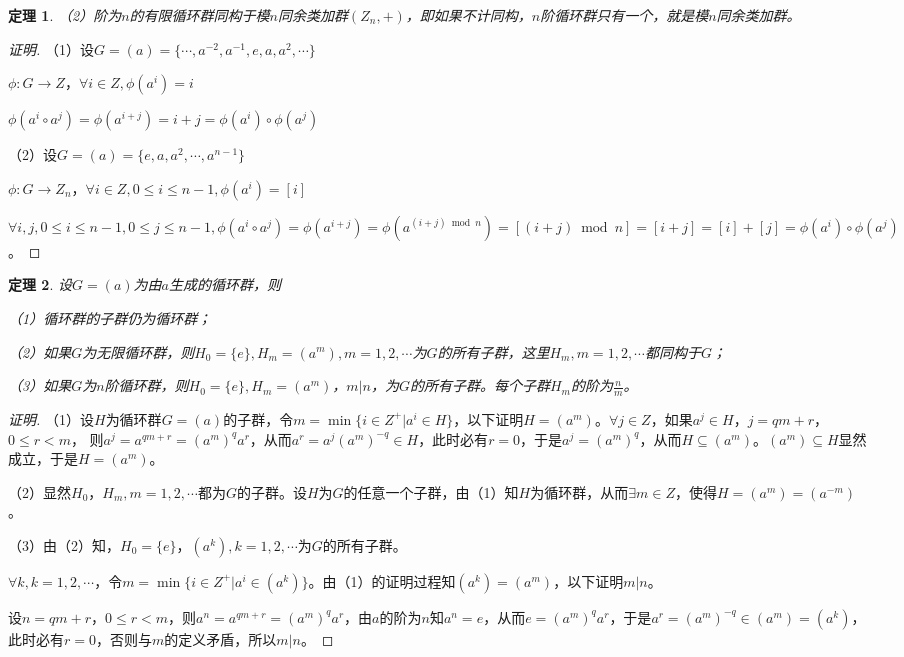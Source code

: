 \documentclass{article}
\newtheorem{Thm}{定理}
\begin{document}
\begin{CJK*}{UTF8}{gbsn}
\begin{Thm}
  （2）阶为$n$的有限循环群同构于模$n$同余类加群$(Z_n,+)$，即如果不计同构，$n$阶循环群只有一个，就是模$n$同余类加群。
\end{Thm}
\begin{proof}[证明]
  （1）设$G=(a)=\{\cdots,a^{-2},a^{-1},e,a,a^2,\cdots\}$

  $\phi:G\to Z$，$\forall i\in Z, \phi(a^i)=i$

  $\phi(a^i\circ a^j)=\phi(a^{i+j})=i+j=\phi(a^i)\circ\phi(a^j)$

  （2）设$G=(a)=\{e,a,a^2,\cdots,a^{n-1}\}$

  $\phi:G\to Z_n$，$\forall i\in Z, 0\leq i\leq n-1,\phi(a^i)=[i]$

  $\forall i,j, 0\leq i\leq n-1,0\leq j\leq n-1,\phi(a^i\circ a^j)=\phi(a^{i+j})=\phi(a^{(i+j)\bmod n})=[(i+j)\bmod n]=[i+j]=[i]+[j]=\phi(a^i)\circ \phi(a^j)$。

\end{proof}
\begin{Thm}
  设$G=(a)$为由$a$生成的循环群，则

  （1）循环群的子群仍为循环群；

  （2）如果$G$为无限循环群，则$H_0=\{e\},H_m=(a^m),m=1,2,\cdots$为$G$的所有子群，这里$H_m,m=1,2,\cdots$都同构于$G$；

  （3）如果$G$为$n$阶循环群，则$H_0=\{e\},H_m=(a^m)$，$m|n$，为$G$的所有子群。每个子群$H_m$的阶为$\frac{n}{m}$。
\end{Thm}
\begin{proof}[证明]
  （1）设$H$为循环群$G=(a)$的子群，令$m=\min \{i\in Z^+|a^i\in H\}$，以下证明$H=(a^{m})$。$\forall j\in Z$，如果$a^j\in H$，$j=qm+r$，$0\leq r < m$，
  则$a^j=a^{qm+r}=(a^m)^qa^r$，从而$a^r=a^j(a^{m})^{-q}\in H$，此时必有$r=0$，于是$a^j=(a^m)^q$，从而$H\subseteq (a^m)$。$(a^m)\subseteq H$显然成立，于是$H=(a^m)$。

  （2）显然$H_0$，$H_m,m=1,2,\cdots$都为$G$的子群。设$H$为$G$的任意一个子群，由（1）知$H$为循环群，从而$\exists m\in Z$，使得$H=(a^m)=(a^{-m})$。

  （3）由（2）知，$H_0=\{e\}$，$(a^k),k=1,2,\cdots$为$G$的所有子群。

  $\forall k,k=1,2,\cdots$，令$m=\min \{i\in Z^+|a^i\in (a^k)\}$。由（1）的证明过程知$(a^k)=(a^m)$，以下证明$m|n$。

  设$n=qm+r$，$0\leq r < m$，则$a^n=a^{qm+r}=(a^m)^qa^r$，由$a$的阶为$n$知$a^n=e$，从而$e=(a^m)^qa^r$，于是$a^r=(a^m)^{-q}\in (a^m)=(a^k)$，此时必有$r=0$，否则与$m$的定义矛盾，所以$m|n$。


\end{proof}
\end{CJK*}
\end{document}
